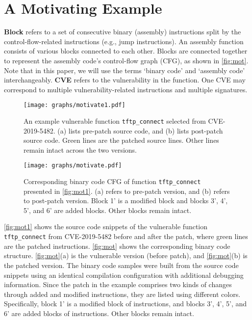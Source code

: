 \section{A Motivating Example}
\label{sec:mot}

 \textbf{Block} refers to a set of consecutive binary (assembly) instructions split by the control-flow-related instructions (e.g., jump instructions). 
An assembly function consists of various blocks connected to each other. 
Blocks are connected together to represent the assembly code's control-flow graph (CFG), as shown in \autoref{fig:mot}. 
Note that in this paper, we will use the terms `binary code' and `assembly code' interchangeably. 
\textbf{CVE} refers to the vulnerability in the function. 
One CVE may correspond to multiple vulnerability-related instructions and multiple signatures.

\begin{figure}[!t]
\centering
\texttt{[image: graphs/motivate1.pdf]}
\caption{An example vulnerable function \texttt{tftp\_connect} selected from CVE-2019-5482. (a) lists pre-patch source code, and (b) lists post-patch source code. Green lines are the patched source lines. Other lines remain intact across the two versions.}
\label{fig:mot1}
\end{figure}

\begin{figure}[!ht]
\centering
\texttt{[image: graphs/motivate.pdf]}
\caption{Corresponding binary code CFG of function \texttt{tftp\_connect} presented in \autoref{fig:mot1}. (a) refers to pre-patch version, and (b) refers to post-patch version. Block 1' is a modified block and blocks 3', 4', 5', and 6' are added blocks. Other blocks remain intact.}
\label{fig:mot}
\end{figure}



\autoref{fig:mot1} shows the source code snippets of the vulnerable function \texttt{tftp\_connect} from CVE-2019-5482 before and after the patch, where green lines are the patched instructions. 
\autoref{fig:mot} shows the corresponding binary code structure.
\autoref{fig:mot}(a) is the vulnerable version (before patch), and \autoref{fig:mot}(b) is the patched version. 
The binary code samples were built from the source code snippets using an identical compilation configuration with additional debugging information. 
Since the patch in the example comprises two kinds of changes through added and modified instructions, they are listed using different colors. 
Specifically, block 1' is a modified block of instructions, and blocks 3', 4', 5', and 6' are added blocks of instructions. 
Other blocks remain intact. 


